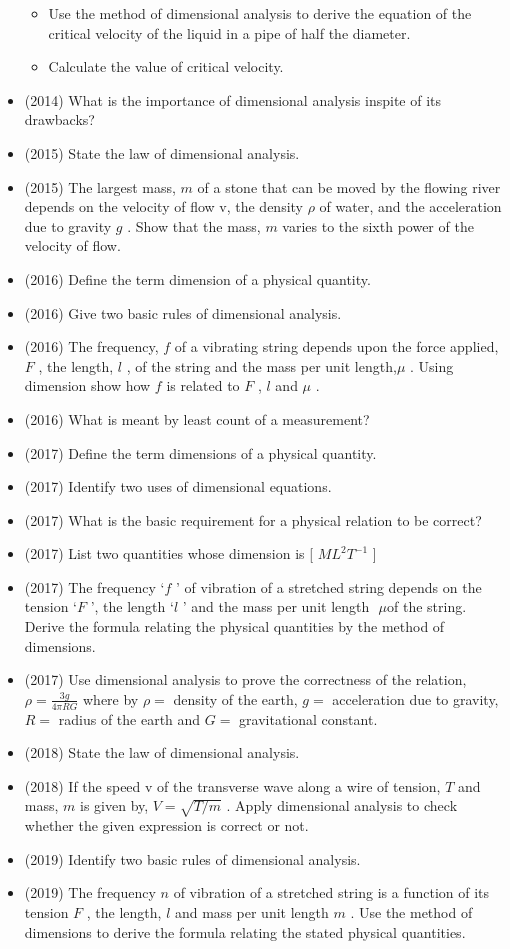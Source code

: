 \documentclass{article}
\begin{document}
\begin{itemize}
 \begin{itemize}
\item Use the method of dimensional analysis to derive the equation of the critical velocity of the liquid in a pipe of half the diameter.
\item Calculate the value of critical velocity.
\end{itemize}
\item (2014)  What is the importance of dimensional analysis inspite of its drawbacks?
\item (2015)  State the law of dimensional analysis.
\item (2015)  The largest mass, $ m$ of a stone that can be moved by the flowing river depends on the velocity of flow v, the density $ \rho $ of water, and the acceleration due to gravity $ g$ . Show that the mass, $ m$ varies to the sixth power of the velocity of flow.
\item (2016)  Define the term dimension of a physical quantity.
\item (2016)  Give two basic rules of dimensional analysis. 
\item (2016)  The frequency, $ f$ of a vibrating string depends upon the force applied, $ F$ , the length, $ l$ , of the string and the mass per unit length,$ \mu $ . Using dimension show how $ f$ is related to $ F$ , $ l$ and $ \mu $ .
\item (2016)  What is meant by least count of a measurement?
\item (2017)  Define the term dimensions of a physical quantity. 
\item (2017)  Identify two uses of dimensional equations.
\item (2017)  What is the basic requirement for a physical relation to be correct? 
\item (2017)  List two quantities whose dimension is [ $ ML^{2}T^{-1}$ ]
\item (2017)  The frequency ‘$ f$ ’ of vibration of a stretched string depends on the tension ‘$ F$ ’, the length ‘$ l$ ’ and the mass per unit length $ $ $\mu$of the string. Derive the formula relating the physical quantities by the method of dimensions. 
\item (2017)  Use dimensional analysis to prove the correctness of the relation, $ \rho = \frac{3g}{4 \pi RG}$ where by $ \rho =$ density of the earth, $ g=$ acceleration due to gravity, $ R=$ radius of the earth and $ G=$ gravitational constant.
\item (2018)  State the law of dimensional analysis. 
\item (2018)  If the speed v of the transverse wave along a wire of tension, $ T$ and mass, $ m$ is given by, $ V=\sqrt{T/m}$ .  Apply dimensional analysis to check whether the given expression is correct or not.  
\item (2019)  Identify two basic rules of dimensional analysis.
\item (2019)  The frequency $ n$ of vibration of a stretched string is a function of its tension $ F$ , the length, $ l$ and mass per unit length $ m$ . Use the method of dimensions to derive the formula relating the stated physical quantities.
\end{itemize}
\end{document}
